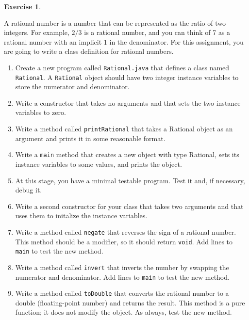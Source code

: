 \documentclass[12pt]{book}
\theoremstyle{definition}
\newtheorem{excz}{Exercise}[chapter]
\newenvironment{exercise}{\bigskip\begin{excz}\mbox{}}{\end{excz}}
\begin{document}
\begin{exercise}
\label{ex.rational}

A rational number is a number that can be represented as the ratio of
two integers.  For example, $2/3$ is a rational number, and you can
think of 7 as a rational number with an implicit 1 in the denominator.
For this assignment, you are going to write a class definition for
rational numbers.

\begin{enumerate}

\item Create a new program called {\tt Rational.java} that defines a
class named {\tt Rational}.  A {\tt Rational} object should have two
integer instance variables to store the numerator and denominator.

\item Write a constructor that takes no arguments and that sets the
two instance variables to zero.

\item Write a method called {\tt printRational} that takes
a Rational object as an argument and prints it in some
reasonable format.

\item Write a {\tt main} method that creates a new object with
type Rational, sets its instance variables to some values, and prints
the object.

\item At this stage, you have a minimal testable
program.  Test it and, if necessary, debug it.

\item Write a second constructor for your class that takes two
arguments and that uses them to initalize the instance
variables.

\item Write a method called {\tt negate} that reverses the sign of
a rational number.  This method should be a modifier, so it should
return {\tt void}.  Add lines to {\tt main} to test the new method.

\item Write a method called {\tt invert} that inverts the number by
  swapping the numerator and denominator.  Add lines to {\tt main} to
  test the new method.

\item Write a method called {\tt toDouble} that converts the rational
number to a double (floating-point number) and returns the result.
This method is a pure function; it does not modify the object.
As always, test the new method.


\end{enumerate}
\end{exercise}
\end{document}

